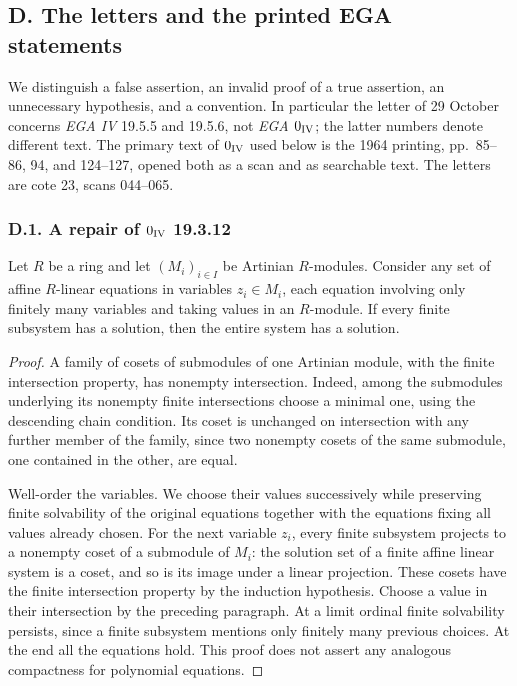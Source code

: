 \subsection{D. The letters and the printed EGA statements}

We distinguish a false assertion, an invalid proof of a true assertion,
an unnecessary hypothesis, and a convention.  In particular the letter
of 29 October concerns \emph{EGA IV} 19.5.5 and 19.5.6, not
\emph{EGA $0_{\rm IV}$}; the latter numbers denote different text.
The primary text of $0_{\rm IV}$ used below is the 1964 printing,
pp.~85--86, 94, and 124--127, opened both as a scan and as searchable
text.  The letters are cote 23, scans 044--065.
\cite{algEGAIV1,algEGAIV4}

\subsubsection{D.1. A repair of \texorpdfstring{$0_{\rm IV}$}{0-IV} 19.3.12}

\begin{lemma}\label{SA23-D-1}
Let $R$ be a ring and let $(M_i)_{i\in I}$ be Artinian $R$-modules.
Consider any set of affine $R$-linear equations in variables
$z_i\in M_i$, each equation involving only finitely many variables
and taking values in an $R$-module.  If every finite subsystem has a
solution, then the entire system has a solution.
\end{lemma}
\begin{proof}
A family of cosets of submodules of one Artinian module, with the
finite intersection property, has nonempty intersection.  Indeed,
among the submodules underlying its nonempty finite intersections
choose a minimal one, using the descending chain condition.  Its
coset is unchanged on intersection with any further member of the
family, since two nonempty cosets of the same submodule, one contained
in the other, are equal.

Well-order the variables.  We choose their values successively while
preserving finite solvability of the original equations together with
the equations fixing all values already chosen.  For the next
variable $z_i$, every finite subsystem projects to a nonempty coset
of a submodule of $M_i$: the solution set of a finite affine linear
system is a coset, and so is its image under a linear projection.
These cosets have the finite intersection property by the induction
hypothesis.  Choose a value in their intersection by the preceding
paragraph.  At a limit ordinal finite solvability persists, since a
finite subsystem mentions only finitely many previous choices.  At
the end all the equations hold.  This proof does not assert any
analogous compactness for polynomial equations.
\end{proof}


